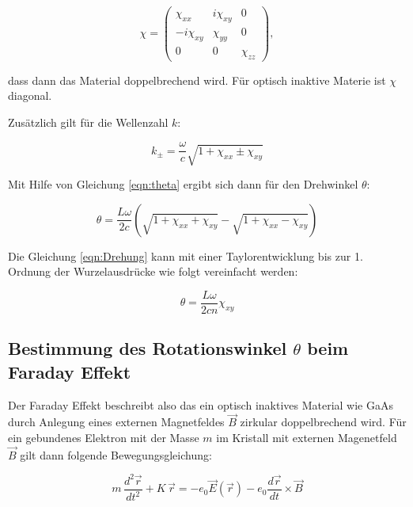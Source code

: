 \begin{equation}
    \chi = \begin{pmatrix}
            \chi_{xx} & i \chi_{xy} & 0 \\
            -i \chi_{xy} & \chi_{yy} & 0 \\
            0 & 0 & \chi_{zz}
        \end{pmatrix} ,
    \label{eqn:chi}
\end{equation}

dass dann das Material doppelbrechend wird. Für optisch inaktive Materie ist $\chi$ diagonal.

Zusätzlich gilt für die Wellenzahl $k$:

\begin{equation}
    k_\pm = \frac{\omega}{c} \sqrt{1 + \chi_{xx} \pm \chi_{xy}}
    \label{eqn:k}
\end{equation}

Mit Hilfe von Gleichung \eqref{eqn:theta} ergibt sich dann für den Drehwinkel $\theta$:

\begin{equation}
    \theta = \frac{L \omega}{2 c} \left( \sqrt{1 + \chi_{xx} + \chi_{xy}} - \sqrt{1 + \chi_{xx} - \chi_{xy}} \right)
    \label{eqn:Drehung}
\end{equation}

Die Gleichung \eqref{eqn:Drehung} kann mit einer Taylorentwicklung bis zur 1. Ordnung der Wurzelausdrücke wie folgt vereinfacht werden:

\begin{equation}
    \theta = \frac{L \omega}{2 c n} \chi_{xy}
    \label{eqn:taylor_theta}
\end{equation}

\subsection[Bestimmung des Rotationswinkel beim Faraday Effekt]{Bestimmung des Rotationswinkel $\theta$ beim Faraday Effekt}
\label{sec:Rotation}

Der Faraday Effekt beschreibt also das ein optisch inaktives Material wie GaAs durch Anlegung eines externen Magnetfeldes $\vec{B}$ zirkular doppelbrechend wird. Für ein gebundenes Elektron mit der Masse $m$ im Kristall mit externen Magenetfeld $\vec{B}$ gilt dann folgende Bewegungsgleichung:

\begin{equation}
    m \, \frac{d^2 \vec{r}}{dt^2} + K \, \vec{r} = - e_0 \vec{E} \left( \vec{r} \right) - e_0 \frac{d \vec{r}}{dt} \times \vec{B}
    \label{eqn:beweg}
\end{equation}

